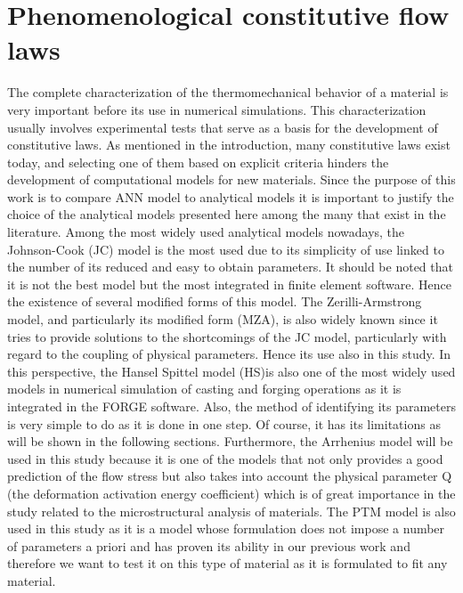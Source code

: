 \documentclass[twoside,english,1p,final,sort&compress]{elsarticle}
\theoremstyle{plain}
\begin{document}
\section{Phenomenological constitutive flow laws\label{sec:ConstLaws}}
The complete characterization of the thermomechanical behavior of a material is very important before its use in numerical simulations. This characterization usually involves experimental tests that serve as a basis for the development of constitutive laws. As mentioned in the introduction, many constitutive laws exist today, and selecting one of them based on explicit criteria hinders the development of computational models for new materials. Since the purpose of this work is to compare ANN model to analytical models it is important to justify the choice of the analytical models presented here among the many that exist in the literature. Among the most widely used analytical models nowadays, the Johnson-Cook (JC) model is the most used due to its simplicity of use linked to the number of its reduced and easy to obtain parameters. It should be noted that it is not the best model but the most integrated in finite element software. Hence the existence of several modified forms of this model. The Zerilli-Armstrong model, and particularly its modified form (MZA), is also widely known since it tries to provide solutions to the shortcomings of the JC model, particularly with regard to the coupling of physical parameters. Hence its use also in this study. In this perspective, the Hansel Spittel model (HS)is also one of the most widely used models in numerical simulation of casting and forging operations as it is integrated in the FORGE software. Also, the method of identifying its parameters is very simple to do as it is done in one step. Of course, it has its limitations as will be shown in the following sections. Furthermore, the Arrhenius model will be used in this study because it is one of the models that not only provides a good prediction of the flow stress but also takes into account the physical parameter Q (the deformation activation energy coefficient) which is of great importance in the study related to the microstructural analysis of materials. The PTM model is also used in this study as it is a model whose formulation does not impose a number of parameters a priori and has proven its ability in our previous work and therefore we want to test it on this type of material as it is formulated to fit any material.
\end{document}
